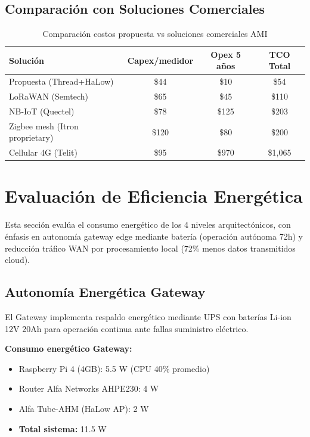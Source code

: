 \subsection{Comparación con Soluciones Comerciales}
\label{sec:res-comparacion-comercial}

\begin{table}[H]
\centering
\caption{Comparación costos propuesta vs soluciones comerciales AMI}
\label{tab:comparacion-comercial}
\begin{tabular}{|l|c|c|c|}
\hline
\rowcolor{gray!20}
\textbf{Solución} & \textbf{Capex/medidor} & \textbf{Opex 5 años} & \textbf{TCO Total} \\
\hline
Propuesta (Thread+HaLow) & \$44 & \$10 & \$54 \\
\hline
LoRaWAN (Semtech) & \$65 & \$45 & \$110 \\
\hline
NB-IoT (Quectel) & \$78 & \$125 & \$203 \\
\hline
Zigbee mesh (Itron proprietary) & \$120 & \$80 & \$200 \\
\hline
Cellular 4G (Telit) & \$95 & \$970 & \$1,065 \\
\hline
\end{tabular}
\end{table}


\section{Evaluación de Eficiencia Energética}
\label{sec:res-energia}

Esta sección evalúa el consumo energético de los 4 niveles arquitectónicos, con énfasis en autonomía gateway edge mediante batería (operación autónoma 72h) y reducción tráfico WAN por procesamiento local (72\% menos datos transmitidos cloud).

\subsection{Autonomía Energética Gateway}

El Gateway implementa respaldo energético mediante UPS con baterías Li-ion 12V 20Ah para operación continua ante fallas suministro eléctrico.

\textbf{Consumo energético Gateway:}
\begin{itemize}
    \item Raspberry Pi 4 (4GB): 5.5 W (CPU 40\% promedio)
    \item Router Alfa Networks AHPE230: 4 W
    \item Alfa Tube-AHM (HaLow AP): 2 W
    \item \textbf{Total sistema:} 11.5 W
\end{itemize}

